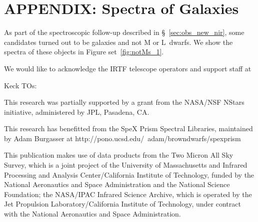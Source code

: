 \documentclass[12pt,preprint]{aastex}
\begin{document}
% 


\appendix
\section{APPENDIX: Spectra of Galaxies}
\label{sec:galaxies}
As part of the spectroscopic follow-up described in \S~\ref{sec:obs_new_nir}, some candidates turned out to be galaxies and not M or L~dwarfs. We show the spectra of these objects in Figure set~\ref{fig:notMs_1}.


\acknowledgments
We would like to acknowledge the IRTF telescope operators
and support staff at 

Keck TOs:

This research was partially supported by a grant from the NASA/NSF NStars initiative, administered by JPL, Pasadena, CA.  

This research has benefitted from the SpeX Prism Spectral Libraries, maintained by Adam Burgasser at http://pono.ucsd.edu/~adam/browndwarfs/spexprism

This publication makes use of data products from the Two Micron All Sky Survey, which is a joint project of the University of Massachusetts and Infrared Processing and Analysis Center/California Institute of Technology, funded by the National Aeronautics and Space Administration and the National Science Foundation; the NASA/IPAC Infrared Science Archive, which is operated by the Jet Propulsion Laboratory/California Institute of Technology, under contract with the National Aeronautics and Space Administration.  
\end{document}
